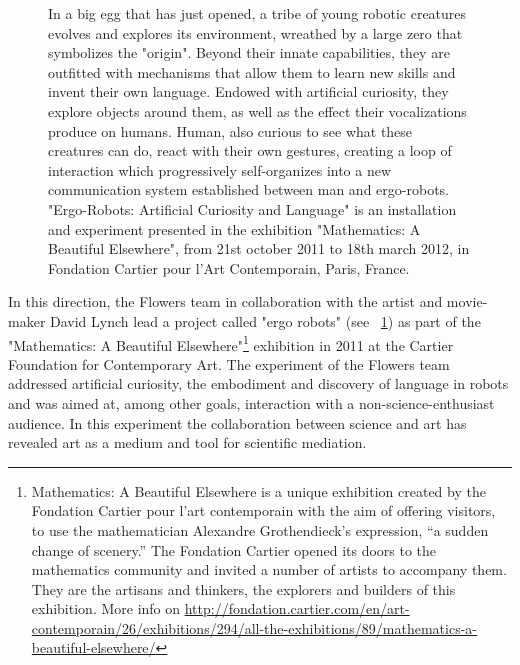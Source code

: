 \begin{figure}[!tb]
\centering
    \hfil
    \caption{In a big egg that has just opened, a tribe of young robotic creatures evolves and explores its environment, wreathed by a large zero that symbolizes the "origin". Beyond their innate capabilities, they are outfitted with mechanisms that allow them to learn new skills and invent their own language. Endowed with artificial curiosity, they explore objects around them, as well as the effect their vocalizations produce on humans. Human, also curious to see what these creatures can do, react with their own gestures, creating a loop of interaction which progressively self-organizes into a new communication system established between man and ergo-robots. "Ergo-Robots: Artificial Curiosity and Language" is an installation and experiment presented in the exhibition "Mathematics: A Beautiful Elsewhere", from 21st october 2011 to 18th march 2012, in Fondation Cartier pour l’Art Contemporain, Paris, France. }
    \label{fig:ergo_robot}
\end{figure}

In this direction, the Flowers team in collaboration with the artist and movie-maker David Lynch lead a project called "ergo robots" (see \figurename~\ref{fig:ergo_robot}) as part of the "Mathematics: A Beautiful Elsewhere"\footnote{Mathematics: A Beautiful Elsewhere is a unique exhibition created by the Fondation Cartier pour l’art contemporain with the aim of offering visitors, to use the mathematician Alexandre Grothendieck’s expression, “a sudden change of scenery.” The Fondation Cartier opened its doors to the mathematics community and invited a number of artists to accompany them. They are the artisans and thinkers, the explorers and builders of this exhibition. More info on \url{http://fondation.cartier.com/en/art-contemporain/26/exhibitions/294/all-the-exhibitions/89/mathematics-a-beautiful-elsewhere/}} exhibition in 2011 at the Cartier Foundation for Contemporary Art. The experiment of the Flowers team addressed artificial curiosity, the embodiment and discovery of language in robots and was aimed at, among other goals, interaction with a non-science-enthusiast audience. In this experiment the collaboration between science and art has revealed art as a medium and tool for scientific mediation.




